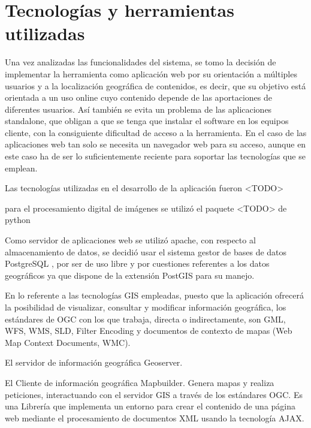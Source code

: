\section{Tecnologías y herramientas utilizadas}

Una vez analizadas las funcionalidades del sistema, se tomo la decisión de implementar la herramienta
como aplicación web por su orientación a múltiples usuarios y a la localización geográfica de contenidos,
es decir, que su objetivo está orientada a un uso online cuyo contenido depende de las aportaciones de
diferentes usuarios. Así también se evita un problema de las aplicaciones standalone, que obligan a que
se tenga que instalar el software en los equipos cliente, con la consiguiente dificultad de acceso a la
herramienta. En el caso de las aplicaciones web tan solo se necesita un navegador web para su acceso,
aunque en este caso ha de ser lo suficientemente reciente para soportar las tecnologías que se emplean.

Las tecnologías utilizadas en el desarrollo de la aplicación fueron <TODO>

para el procesamiento digital de imágenes se utilizó el paquete <TODO> de python

Como servidor de aplicaciones web se utilizó apache, con respecto al almacenamiento de datos, 
se decidió usar el sistema gestor de bases de datos PostgreSQL , por ser de uso libre y por 
cuestiones referentes a los datos geográficos ya que dispone de la extensión PostGIS para su manejo.


En lo referente a las tecnologías GIS empleadas, puesto que la aplicación ofrecerá la posibilidad 
de visualizar, consultar y modificar información geográfica, los estándares de OGC con los que trabaja, directa o indirectamente, son GML, WFS, WMS, SLD,
Filter Encoding y documentos de contexto de mapas (Web Map Context Documents, WMC).

El servidor de información geográfica Geoserver. 


El Cliente de información geográfica Mapbuilder. Genera mapas y realiza peticiones, 
interactuando con el servidor GIS a través de los estándares OGC. Es una Librería que 
implementa un entorno para crear el contenido de una página web mediante el procesamiento 
de documentos XML usando la tecnología AJAX.


